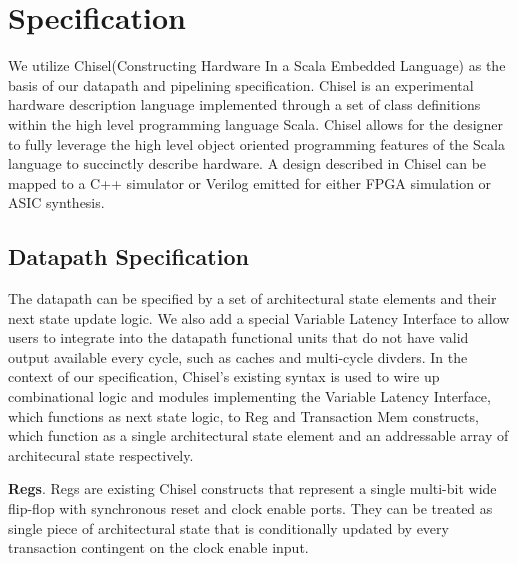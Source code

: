 \section{Specification}
We utilize Chisel(Constructing Hardware In a Scala Embedded Language)
as the basis of our datapath and pipelining specification. Chisel is
an experimental hardware description language implemented through a
set of class definitions within the high level programming language
Scala. Chisel allows for the designer to fully leverage the high level
object oriented programming features of the Scala language to
succinctly describe hardware. A design described in Chisel can be
mapped to a C++ simulator or Verilog emitted for either FPGA
simulation or ASIC synthesis.

\subsection{Datapath Specification}
The datapath can be specified by a set of architectural state elements
and their next state update logic. We also add a special Variable
Latency Interface to allow users to integrate into the datapath
functional units that do not have valid output available every cycle,
such as caches and multi-cycle divders. In the context of our
specification, Chisel's existing syntax is used to wire up
combinational logic and modules implementing the Variable Latency
Interface, which functions as next state logic, to Reg and Transaction
Mem constructs, which function as a single architectural state element
and an addressable array of architecural state respectively.

{\bf Regs}. Regs are existing Chisel constructs that represent a
single multi-bit wide flip-flop with synchronous reset and clock
enable ports. They can be treated as single piece of architectural
state that is conditionally updated by every transaction contingent on
the clock enable input.

